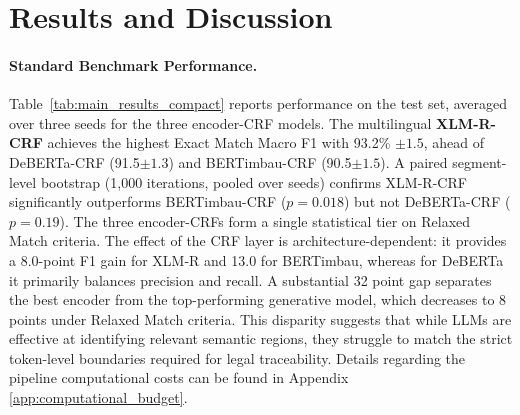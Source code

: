 \documentclass[11pt]{article}
\begin{document}
\section{Results and Discussion}
\label{sec:results}

\paragraph{Standard Benchmark Performance.}
Table~\ref{tab:main_results_compact} reports performance on the test set, averaged over three seeds for the three encoder-CRF models. The multilingual \textbf{XLM-R-CRF} achieves the highest Exact Match Macro F1 with 93.2\% ${\pm 1.5}$, ahead of DeBERTa-CRF (91.5${\pm 1.3}$) and BERTimbau-CRF (90.5${\pm 1.5}$). A paired segment-level bootstrap (1{,}000 iterations, pooled over seeds) confirms XLM-R-CRF significantly outperforms BERTimbau-CRF ($p{=}0.018$) but not DeBERTa-CRF ($p{=}0.19$). The three encoder-CRFs form a single statistical tier on Relaxed Match criteria. The effect of the CRF layer is architecture-dependent: it provides a 8.0-point F1 gain for XLM-R and 13.0 for BERTimbau, whereas for DeBERTa it primarily balances precision and recall. A substantial 32 point gap separates the best encoder from the top-performing generative model, which decreases to 8 points under Relaxed Match criteria. This disparity suggests that while LLMs are effective at identifying relevant semantic regions, they struggle to match the strict token-level boundaries required for legal traceability. Details regarding the pipeline computational costs can be found in Appendix \ref{app:computational_budget}.
\end{document}

